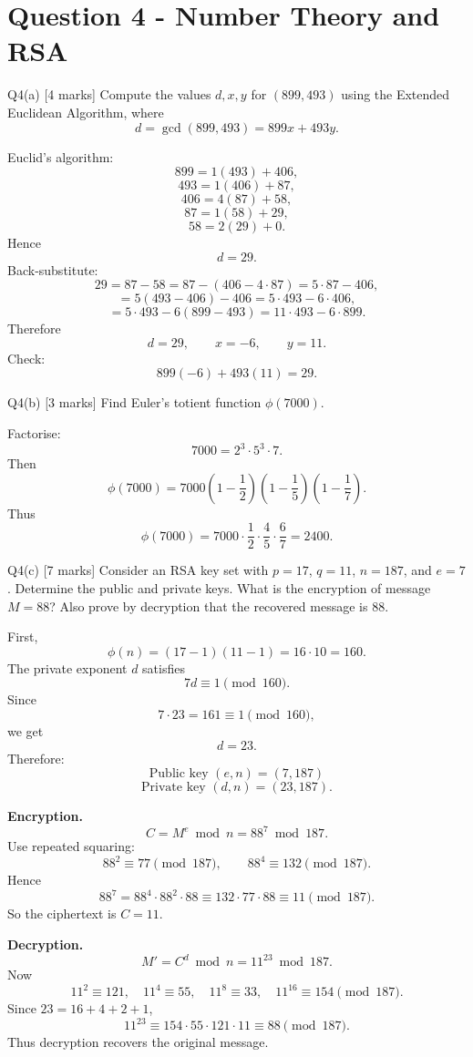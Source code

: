 \documentclass[10.5pt,a4paper]{article}
\begin{document}
\section{Question 4 - Number Theory and RSA}

\begin{questionbox}{Q4(a) [4 marks]}
Compute the values $d,x,y$ for $(899,493)$ using the Extended Euclidean Algorithm, where
\[
d=\gcd(899,493)=899x+493y.
\]
\end{questionbox}

\begin{answerbox}
Euclid's algorithm:
\[
899=1(493)+406,
\]
\[
493=1(406)+87,
\]
\[
406=4(87)+58,
\]
\[
87=1(58)+29,
\]
\[
58=2(29)+0.
\]
Hence
\[
\boxed{d=29}.
\]
Back-substitute:
\[
29=87-58
=87-(406-4\cdot87)
=5\cdot87-406,
\]
\[
=5(493-406)-406
=5\cdot493-6\cdot406,
\]
\[
=5\cdot493-6(899-493)
=11\cdot493-6\cdot899.
\]
Therefore
\[
\boxed{d=29,\qquad x=-6,\qquad y=11.}
\]
Check:
\[
899(-6)+493(11)=29.
\]
\end{answerbox}

\begin{questionbox}{Q4(b) [3 marks]}
Find Euler's totient function $\phi(7000)$.
\end{questionbox}

\begin{answerbox}
Factorise:
\[
7000=2^3\cdot5^3\cdot7.
\]
Then
\[
\phi(7000)
=7000\left(1-\frac12\right)
\left(1-\frac15\right)
\left(1-\frac17\right).
\]
Thus
\[
\phi(7000)=7000\cdot\frac12\cdot\frac45\cdot\frac67
=\boxed{2400}.
\]
\end{answerbox}

\begin{questionbox}{Q4(c) [7 marks]}
Consider an RSA key set with $p=17$, $q=11$, $n=187$, and $e=7$. Determine the public and private keys. What is the encryption of message $M=88$? Also prove by decryption that the recovered message is $88$.
\end{questionbox}

\begin{answerbox}
First,
\[
\phi(n)=(17-1)(11-1)=16\cdot10=160.
\]
The private exponent $d$ satisfies
\[
7d\equiv1\pmod{160}.
\]
Since
\[
7\cdot23=161\equiv1\pmod{160},
\]
we get
\[
\boxed{d=23}.
\]
Therefore:
\[
\boxed{\text{Public key }(e,n)=(7,187)}
\]
\[
\boxed{\text{Private key }(d,n)=(23,187)}.
\]

\textbf{Encryption.}
\[
C=M^e\bmod n=88^7\bmod187.
\]
Use repeated squaring:
\[
88^2\equiv77\pmod{187},
\qquad
88^4\equiv132\pmod{187}.
\]
Hence
\[
88^7=88^4\cdot88^2\cdot88
\equiv132\cdot77\cdot88
\equiv\boxed{11}\pmod{187}.
\]
So the ciphertext is $C=11$.

\textbf{Decryption.}
\[
M'=C^d\bmod n=11^{23}\bmod187.
\]
Now
\[
11^2\equiv121,
\quad11^4\equiv55,
\quad11^8\equiv33,
\quad11^{16}\equiv154\pmod{187}.
\]
Since $23=16+4+2+1$,
\[
11^{23}\equiv154\cdot55\cdot121\cdot11\equiv\boxed{88}\pmod{187}.
\]
Thus decryption recovers the original message.
\end{answerbox}
\end{document}
